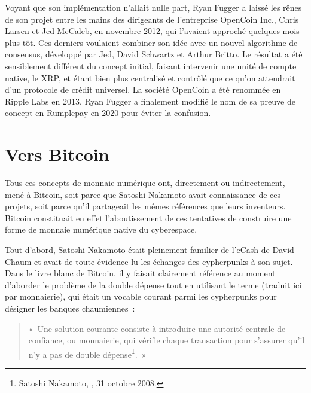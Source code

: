 Voyant que son implémentation n'allait nulle part, Ryan Fugger a laissé les rênes de son projet entre les mains des dirigeants de l'entreprise OpenCoin Inc., Chris Larsen et Jed McCaleb, en novembre 2012, qui l'avaient approché quelques mois plus tôt. Ces derniers voulaient combiner son idée avec un nouvel algorithme de consensus, développé par Jed, David Schwartz et Arthur Britto. Le résultat a été sensiblement différent du concept initial, faisant intervenir une unité de compte native, le XRP, et étant bien plus centralisé et contrôlé que ce qu'on attendrait d'un protocole de crédit universel. La société OpenCoin a été renommée en Ripple Labs en 2013. Ryan Fugger a finalement modifié le nom de sa preuve de concept en Rumplepay en 2020 pour éviter la confusion.

\section*{Vers Bitcoin}

Tous ces concepts de monnaie numérique ont, directement ou indirectement, mené à Bitcoin, soit parce que Satoshi Nakamoto avait connaissance de ces projets, soit parce qu'il partageait les mêmes références que leurs inventeurs. Bitcoin constituait en effet l'aboutissement de ces tentatives de construire une forme de monnaie numérique native du cyberespace.

Tout d'abord, Satoshi Nakamoto était pleinement familier de l'eCash de David Chaum et avait de toute évidence lu les échanges des cypherpunks à son sujet. Dans le livre blanc de Bitcoin, il y faisait clairement référence au moment d'aborder le problème de la double dépense tout en utilisant le terme  (traduit ici par monnaierie), qui était un vocable courant parmi les cypherpunks pour désigner les banques chaumiennes~:

\begin{quote}
«~Une solution courante consiste à introduire une autorité centrale de confiance, ou monnaierie, qui vérifie chaque transaction pour s'assurer qu'il n'y a pas de double dépense\footnote{Satoshi Nakamoto, , 31 octobre 2008.}.~»
\end{quote}

